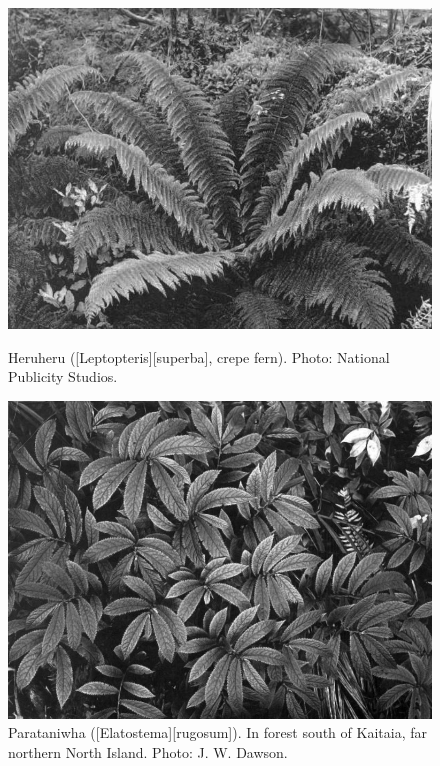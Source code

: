 \begin{figure}[!b]
	\begin{minipage}[t]{\textwidth}
		\begin{minipage}[t]{(\textwidth-\fgap) * \real{0.497}}
			\centering
			\includegraphics[width=\textwidth]{graphics/fig_062}
			\caption[Heruheru (\emph{Leptopteris superba}, crepe fern)]{Heruheru ([Leptopteris][superba], crepe fern).
			Photo: National Publicity Studios.}%
			\label{fig:62crepefern}
		\end{minipage}\hspace{\fgap}%
		\begin{minipage}[t]{(\textwidth-\fgap) * \real{0.503}}
			\centering
			\includegraphics[width=\textwidth]{graphics/fig_063}
			\caption[Parataniwha]{Parataniwha ([Elatostema][rugosum]).
			In forest south of Kaitaia, far northern North Island.
			Photo: J. W. Dawson.}%
			\label{fig:63parataniwha}
		\end{minipage}
	\end{minipage}
\end{figure}

